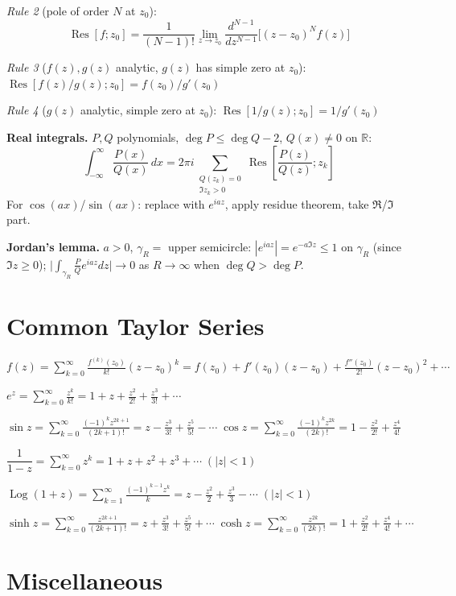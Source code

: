 \documentclass[9pt,twocolumn]{extarticle}
\newcommand{\Res}{\operatorname{Res}}
\begin{document}
\textit{Rule 2} (pole of order $N$ at $z_0$):
$$\Res[f;z_0]=\frac{1}{(N-1)!}\lim_{z\to z_0}\frac{d^{N-1}}{dz^{N-1}}\bigl[(z-z_0)^Nf(z)\bigr]$$

\textit{Rule 3} ($f(z),g(z)$ analytic, $g(z)$ has simple zero at $z_0$):
$\Res[f(z)/g(z);z_0]=f(z_0)/g'(z_0)$

\textit{Rule 4} ($g(z)$ analytic, simple zero at $z_0$): $\Res[1/g(z);z_0]=1/g'(z_0)$

\textbf{Real integrals.} $P,Q$ polynomials, $\deg P\le\deg Q-2$, $Q(x)\ne0$ on $\mathbb{R}$:
$$\int_{-\infty}^\infty\frac{P(x)}{Q(x)}\,dx=2\pi i\!\!\sum_{\substack{Q(z_k)=0\\\Im z_k>0}}\Res\!\left[\frac{P(z)}{Q(z)};z_k\right]$$
For $\cos(ax)$/$\sin(ax)$: replace with $e^{iaz}$, apply residue theorem, take $\Re$/$\Im$ part.

\textbf{Jordan's lemma.} $a>0$, $\gamma_R=$ upper semicircle: $|e^{iaz}|=e^{-a\Im z}\le1$ on $\gamma_R$
(since $\Im z\ge0$);\; $\bigl|\int_{\gamma_R}\tfrac{P}{Q}e^{iaz}dz\bigr|\to0$ as $R\to\infty$ when $\deg Q>\deg P$.

\section{Common Taylor Series}
{\footnotesize
$f(z)=\displaystyle\sum_{k=0}^\infty\frac{f^{(k)}(z_0)}{k!}(z-z_0)^k
=f(z_0)+f'(z_0)(z-z_0)+\tfrac{f''(z_0)}{2!}(z-z_0)^2+\cdots$

$e^z=\displaystyle\sum_{k=0}^\infty\frac{z^k}{k!}=1+z+\frac{z^2}{2!}+\frac{z^3}{3!}+\cdots$

$\sin z=\displaystyle\sum_{k=0}^\infty\frac{(-1)^kz^{2k+1}}{(2k+1)!}=z-\frac{z^3}{3!}+\frac{z^5}{5!}-\cdots\;\cos z=\displaystyle\sum_{k=0}^\infty\frac{(-1)^kz^{2k}}{(2k)!}=1-\frac{z^2}{2!}+\frac{z^4}{4!}$

$\dfrac{1}{1-z}=\displaystyle\sum_{k=0}^\infty z^k=1+z+z^2+z^3+\cdots\;(|z|<1)$

$\operatorname{Log}(1+z)=\displaystyle\sum_{k=1}^\infty\frac{(-1)^{k-1}z^k}{k}=z-\frac{z^2}{2}+\frac{z^3}{3}-\cdots\;(|z|<1)$

$\sinh z=\displaystyle\sum_{k=0}^\infty\frac{z^{2k+1}}{(2k+1)!}=z+\frac{z^3}{3!}+\frac{z^5}{5!}+\cdots\;\cosh z=\displaystyle\sum_{k=0}^\infty\frac{z^{2k}}{(2k)!}=1+\frac{z^2}{2!}+\frac{z^4}{4!}+\cdots$
}

\section{Miscellaneous}
\end{document}
